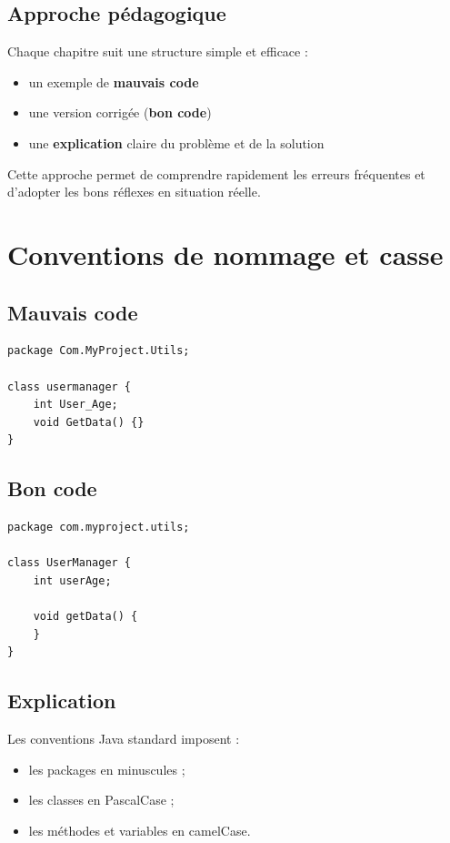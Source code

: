 \documentclass[a4paper,11pt]{report}
\begin{document}
\section{Approche pédagogique}

Chaque chapitre suit une structure simple et efficace :
\begin{itemize}
  \item un exemple de \textbf{mauvais code}
  \item une version corrigée (\textbf{bon code})
  \item une \textbf{explication} claire du problème et de la solution
\end{itemize}

Cette approche permet de comprendre rapidement les erreurs fréquentes et d'adopter les bons réflexes en situation réelle.

\chapter{Conventions de nommage et casse}

\section{Mauvais code}
\begin{lstlisting}
package Com.MyProject.Utils;

class usermanager {
    int User_Age;
    void GetData() {}
}
\end{lstlisting}

\section{Bon code}
\begin{lstlisting}
package com.myproject.utils;

class UserManager {
    int userAge;

    void getData() {
    }
}
\end{lstlisting}

\section{Explication}
Les conventions Java standard imposent :
\begin{itemize}
  \item les packages en minuscules ;
  \item les classes en PascalCase ;
  \item les méthodes et variables en camelCase.
\end{itemize}
\end{document}
